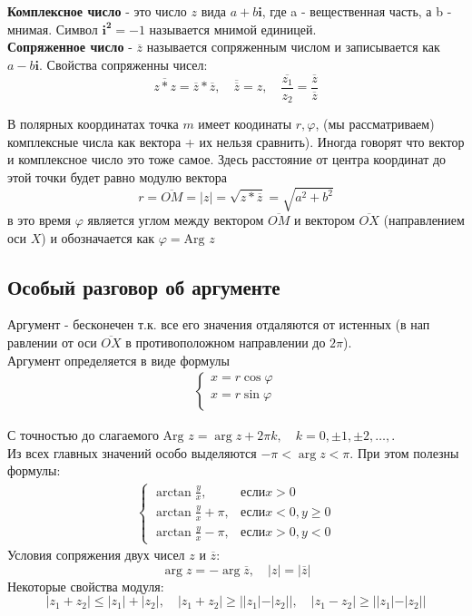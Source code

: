 \documentclass{article}
\begin{document}
\textbf{Комплексное число} - это число \(z\) вида \(a + b\mathbf{i}\), где a -
вещественная часть, а b - мнимая. Символ \(\mathbf{i^2}=-1\) называется
мнимой единицей. \\
\textbf{Сопряженное число} - \( \overline{z}\) называется сопряженным числом и
записывается как \(a - b\mathbf{i}\). Свойства сопряженны чисел:
\begin{equation*}
    \overline{z*z} = \overline{z} * \overline{z},
    \quad \overline{\overline{z}} = z,
    \quad \overline{\frac{z_1}{z_2}} = \frac{\overline{z}}{\overline{z}}
\end{equation*}


В полярных координатах точка \(m\) имеет коодинаты \(r , \varphi\), (мы рассматриваем)
комплексные числа как вектора + их нельзя сравнить). Иногда говорят что вектор
и комплексное число это тоже самое. Здесь расстояние от центра координат до
этой точки будет равно модулю вектора
\[ r = \overline{OM} = |z| = \sqrt{z*\overline{z}} = \sqrt{a^2 + b^2}\]
в это время \(\varphi\) является углом между вектором \(\overline{OM}\) и
вектором \(\overline{OX}\) (направлением оси \(X\)) и обозначается как
\(\varphi=\mbox{Arg }z \)

\subsection{Особый разговор об аргументе}
\quad Аргумент - бесконечен т.к. все его значения отдаляются от истенных (в нап
равлении от оси \(\overline{OX}\) в противоположном направлении до \(2\pi\)). \\
Аргумент определяется в виде формулы
\begin{eqnarray}
    \begin{cases}
        x = r\cos{\varphi} \\
        x = r\sin{\varphi} \\
    \end{cases}
\end{eqnarray}

С точностью до слагаемого
\(\mbox{Arg }z = \arg{z} + 2\pi k, \quad k=0,\pm1,\pm2,\ldots,.\) \\
Из всех главных значений особо выделяются \(-\pi < \arg{z} < \pi \).
При этом полезны формулы:
\begin{eqnarray}
    \begin{cases}
        \arctan{\frac{y}{x}},       & \text{если} x > 0          \\
        \arctan{\frac{y}{x}} + \pi, & \text{если} x < 0, y \ge 0 \\
        \arctan{\frac{y}{x}} - \pi, & \text{если} x > 0, y < 0
    \end{cases}
\end{eqnarray}
Условия сопряжения двух чисел \(z\) и \(\overline{z}\):
\[
    \arg{z} = -\arg{\overline{z}}, \quad |z| = |\overline{z}|
\]
Некоторые свойства модуля:
\[
    |z_1 + z_2| \le |z_1| + |z_2|, \quad |z_1 + z_2| \ge ||z_1| - |z_2||,
    \quad |z_1 - z_2| \ge ||z_1| - |z_2||
\]
\end{document}
